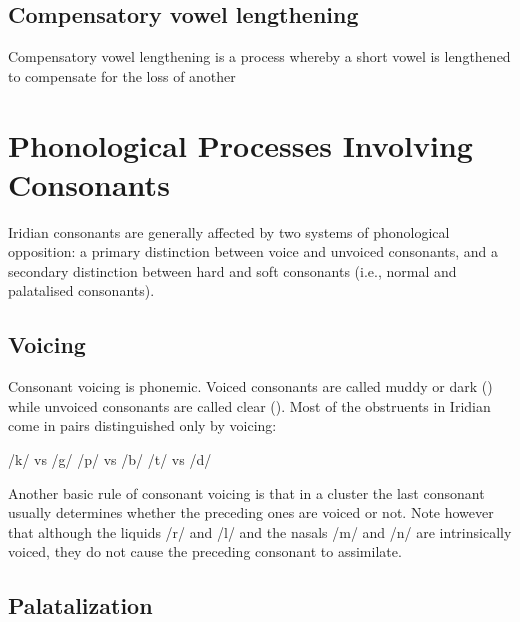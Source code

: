 \ex
{}
\xe


\subsection{Compensatory vowel lengthening}

Compensatory vowel lengthening is a process whereby a short vowel is lengthened
to compensate for the loss of another 

\section{Phonological Processes Involving Consonants}

Iridian consonants are generally affected by two systems of phonological
opposition: a primary distinction between voice and unvoiced consonants, and a
secondary distinction between hard and soft consonants (i.e., normal and
palatalised consonants).

\subsection{Voicing}
Consonant voicing is phonemic. Voiced consonants are called muddy or dark
() while unvoiced consonants are called clear ().
Most of the obstruents in Iridian come in pairs distinguished only by voicing:

\pex
\a /k/  vs /g/ 
\a /p/  vs /b/ 
\a /t/  vs /d/ 
\xe

Another basic rule of consonant voicing is that in a cluster the last consonant
usually determines whether the preceding ones are voiced or not. Note however that although the liquids /r/ and /l/ and the nasals
/m/ and /n/ are intrinsically voiced, they do not cause the preceding consonant
to assimilate.

\pex
\a{} \a{}
\a{} \a{}
\xe

\subsection{Palatalization}

